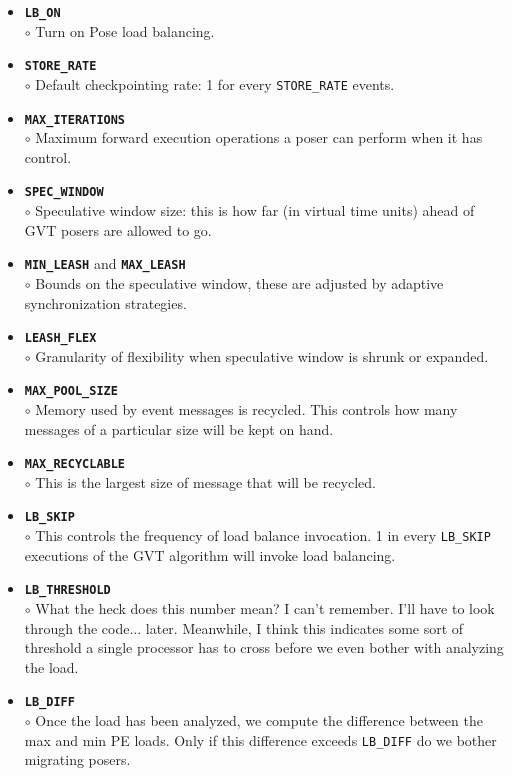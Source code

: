 \documentclass[10pt]{article}
\newcommand{\pose}{{\sc Pose}}
\begin{document}
\begin{itemize}
\item {\tt {\bf LB\_ON}}\\
	$\circ$ Turn on \pose{} load balancing.\\
\item {\tt {\bf STORE\_RATE}}\\
	$\circ$ Default checkpointing rate: 1 for every {\tt STORE\_RATE} events.\\
\item {\tt {\bf MAX\_ITERATIONS}}\\
	$\circ$ Maximum forward execution operations a poser can perform when it has control.\\
\item {\tt {\bf SPEC\_WINDOW}}\\
	$\circ$ Speculative window size: this is how far (in virtual time units) ahead of GVT posers are allowed to go.\\
\item {\tt {\bf MIN\_LEASH}} and {\tt {\bf MAX\_LEASH}}\\
	$\circ$ Bounds on the speculative window, these are adjusted by adaptive synchronization strategies.\\
\item {\tt {\bf LEASH\_FLEX}}\\
	$\circ$ Granularity of flexibility when speculative window is shrunk or expanded.\\
\item {\tt {\bf MAX\_POOL\_SIZE}}\\
	$\circ$ Memory used by event messages is recycled.  This controls how many messages of a particular size will be kept on hand.
\item {\tt {\bf MAX\_RECYCLABLE}}\\
	$\circ$ This is the largest size of message that will be recycled.
\item {\tt {\bf LB\_SKIP}}\\
	$\circ$ This controls the frequency of load balance invocation.  1 in every {\tt LB\_SKIP} executions of the GVT algorithm will invoke load balancing.
\item {\tt {\bf LB\_THRESHOLD}}\\
	$\circ$ What the heck does this number mean?  I can't remember.  I'll have to look through the code... later.  Meanwhile, I think this indicates some sort of threshold a single processor has to cross before we even bother with analyzing the load.\\
\item {\tt {\bf LB\_DIFF}}\\
	$\circ$ Once the load has been analyzed, we compute the difference between the max and min PE loads.  Only if this difference exceeds {\tt LB\_DIFF} do we bother migrating posers.\\
\end{itemize}
\end{document}
